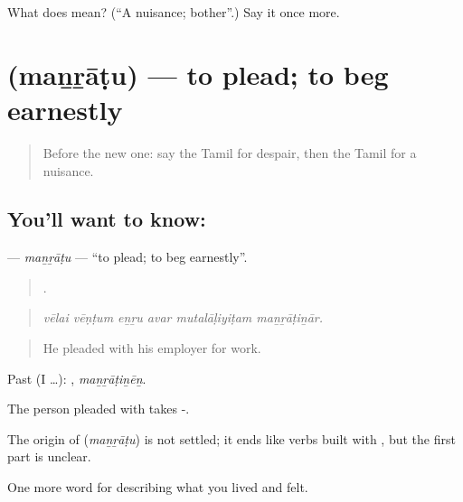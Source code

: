 \begin{tcolorbox}[breakable,colback=teal!4,colframe=teal!35!black,title={Before you move on}]
What does  mean? (\textquotedblleft{}A nuisance; bother\textquotedblright{}.) Say it once more.
\end{tcolorbox}
\section[\texorpdfstring{\ta{மன்றாடு} (maṉṟāṭu)}{மன்றாடு (maṉṟāṭu)}]{ (maṉṟāṭu) — to plead; to beg earnestly}

\label{lesson:TA-C464-manratu}



\begin{quote}
Before the new one: say the Tamil for despair, then the Tamil for a nuisance.
\end{quote}

\subsection*{You'll want to know: }
\textbf{} — \emph{maṉṟāṭu} — \textquotedblleft{}to plead; to beg earnestly\textquotedblright{}.

\begin{quote}
     .
\end{quote}

\begin{quote}
\emph{vēlai vēṇṭum eṉṟu avar mutalāḷiyiṭam maṉṟāṭiṉār.}
\end{quote}

\begin{quote}
He pleaded with his employer for work.
\end{quote}

Past (I …): , \emph{maṉṟāṭiṉēṉ}.

The person pleaded with takes -.

\begin{cousinweb}
The origin of \textbf{} (\emph{maṉṟāṭu}) is not settled; it ends like verbs built with , but the first part is unclear.
\end{cousinweb}

\begin{grammarlens}[title={What you've built}]
One more word for describing what you lived and felt.
\end{grammarlens}

